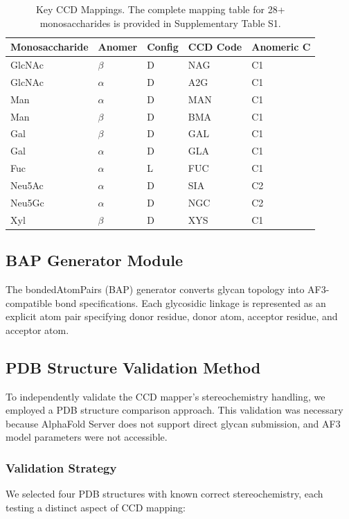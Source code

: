 \documentclass[11pt,a4paper]{article}
\begin{document}
\begin{table}[h]
\centering
\caption{Key CCD Mappings. The complete mapping table for 28+ monosaccharides is provided in Supplementary Table S1.}
\begin{tabular}{lllll}
\toprule
Monosaccharide & Anomer & Config & CCD Code & Anomeric C \\
\midrule
GlcNAc & $\beta$ & D & NAG & C1 \\
GlcNAc & $\alpha$ & D & A2G & C1 \\
Man & $\alpha$ & D & MAN & C1 \\
Man & $\beta$ & D & BMA & C1 \\
Gal & $\beta$ & D & GAL & C1 \\
Gal & $\alpha$ & D & GLA & C1 \\
Fuc & $\alpha$ & L & FUC & C1 \\
Neu5Ac & $\alpha$ & D & SIA & C2 \\
Neu5Gc & $\alpha$ & D & NGC & C2 \\
Xyl & $\beta$ & D & XYS & C1 \\
\bottomrule
\end{tabular}
\end{table}

\subsection{BAP Generator Module}

The bondedAtomPairs (BAP) generator converts glycan topology into AF3-compatible bond specifications. Each glycosidic linkage is represented as an explicit atom pair specifying donor residue, donor atom, acceptor residue, and acceptor atom.

\subsection{PDB Structure Validation Method}
\label{sec:pdb_validation}

To independently validate the CCD mapper's stereochemistry handling, we employed a PDB structure comparison approach. This validation was necessary because AlphaFold Server does not support direct glycan submission, and AF3 model parameters were not accessible.

\subsubsection{Validation Strategy}

We selected four PDB structures with known correct stereochemistry, each testing a distinct aspect of CCD mapping:
\end{document}
